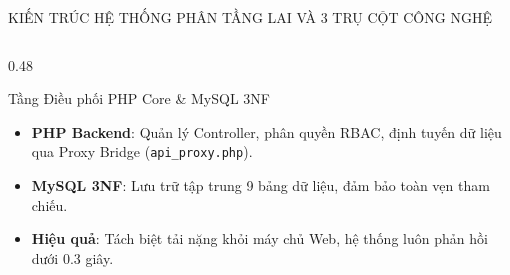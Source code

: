 \documentclass[aspectratio=169, 10pt]{beamer}
\begin{document}
\begin{frame}{KIẾN TRÚC HỆ THỐNG PHÂN TẦNG LAI VÀ 3 TRỤ CỘT CÔNG NGHỆ}
\begin{columns}[T]
\begin{column}{0.48\textwidth}
\begin{greenCard}{Tầng Điều phối PHP Core \& MySQL 3NF}
\begin{itemize}
          \item \textbf{PHP Backend}: Quản lý Controller, phân quyền RBAC, định tuyến dữ liệu qua Proxy Bridge (\texttt{api\_proxy.php}).
          \item \textbf{MySQL 3NF}: Lưu trữ tập trung 9 bảng dữ liệu, đảm bảo toàn vẹn tham chiếu.
          \item \textbf{Hiệu quả}: Tách biệt tải nặng khỏi máy chủ Web, hệ thống luôn phản hồi dưới 0.3 giây.
        \end{itemize}
      \end{greenCard}
    \end{column}
  \end{columns}
\end{frame}

\end{document}
